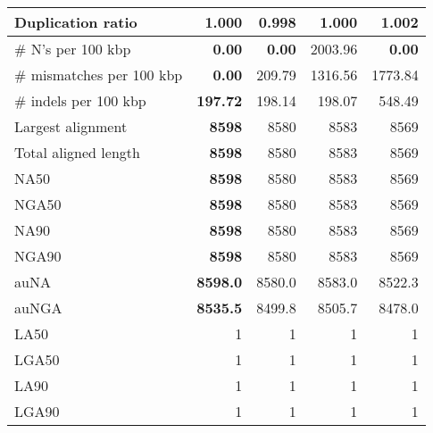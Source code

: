 \documentclass[12pt,a4paper]{article}
\begin{document}
\begin{table}[ht]
\begin{center}
\begin{tabular}{|l*{4}{|r}|}
Duplication ratio & 1.000 & {\bf 0.998} & 1.000 & 1.002 \\ \hline
\# N's per 100 kbp & {\bf 0.00} & {\bf 0.00} & 2003.96 & {\bf 0.00} \\ \hline
\# mismatches per 100 kbp & {\bf 0.00} & 209.79 & 1316.56 & 1773.84 \\ \hline
\# indels per 100 kbp & {\bf 197.72} & 198.14 & 198.07 & 548.49 \\ \hline
Largest alignment & {\bf 8598} & 8580 & 8583 & 8569 \\ \hline
Total aligned length & {\bf 8598} & 8580 & 8583 & 8569 \\ \hline
NA50 & {\bf 8598} & 8580 & 8583 & 8569 \\ \hline
NGA50 & {\bf 8598} & 8580 & 8583 & 8569 \\ \hline
NA90 & {\bf 8598} & 8580 & 8583 & 8569 \\ \hline
NGA90 & {\bf 8598} & 8580 & 8583 & 8569 \\ \hline
auNA & {\bf 8598.0} & 8580.0 & 8583.0 & 8522.3 \\ \hline
auNGA & {\bf 8535.5} & 8499.8 & 8505.7 & 8478.0 \\ \hline
LA50 & 1 & 1 & 1 & 1 \\ \hline
LGA50 & 1 & 1 & 1 & 1 \\ \hline
LA90 & 1 & 1 & 1 & 1 \\ \hline
LGA90 & 1 & 1 & 1 & 1 \\ \hline
\end{tabular}
\end{center}
\end{table}
\end{document}
